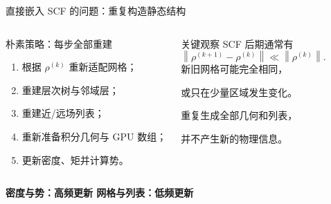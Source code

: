 \documentclass[aspectratio=169,11pt]{beamer}
\newcommand{\norm}[1]{\left\lVert #1\right\rVert}
\begin{document}
\begin{frame}{直接嵌入 SCF 的问题：重复构造静态结构}
  \begin{columns}[T,onlytextwidth]
      \begin{block}{朴素策略：每步全部重建}
        \small
        \begin{enumerate}\setlength\itemsep{0.35em}
          \item 根据 $\rho^{(k)}$ 重新适配网格；
          \item 重建层次树与邻域层；
          \item 重建近/远场列表；
          \item 重新准备积分几何与 GPU 数组；
          \item 更新密度、矩并计算势。
        \end{enumerate}
      \end{block}
      \begin{block}{关键观察}
        \footnotesize
        SCF 后期通常有
        \[
          \norm{\rho^{(k+1)}-\rho^{(k)}}\ll \norm{\rho^{(k)}}.
        \]
        新旧网格可能完全相同，\par
        或只在少量区域发生变化。\par\vspace{0.15em}
        重复生成全部几何和列表，\par
        并不产生新的物理信息。
      \end{block}
  \end{columns}

  \vspace{0.35cm}
  \centering
  \Large\bfseries\color{navy}
  密度与势：高频更新 \qquad 网格与列表：低频更新
\end{frame}
\end{document}
